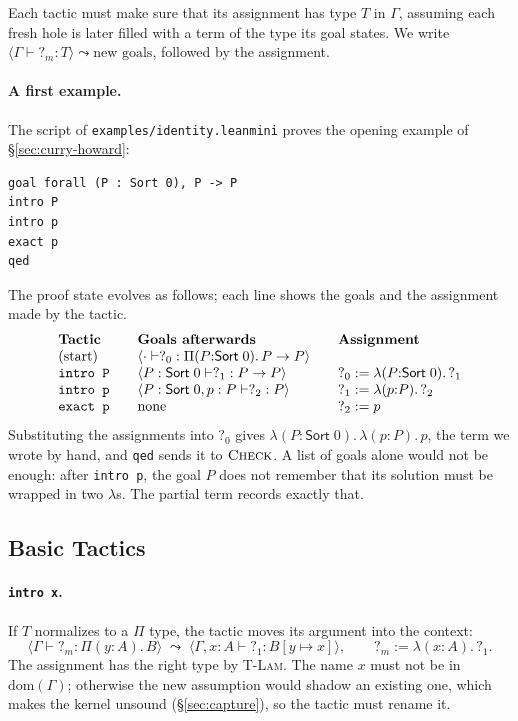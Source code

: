 \documentclass[acmsmall,screen,nonacm]{acmart}
\newcommand{\Sort}[1]{\mathsf{Sort}\;#1}
\newcommand{\tPi}[3]{\Pi(#1{:}#2).\,#3}
\newcommand{\tLam}[3]{\lambda(#1{:}#2).\,#3}
\newcommand{\subst}[3]{#1[#2 \mapsto #3]}
\newcommand{\dom}{\mathrm{dom}}
\newcommand{\hole}[1]{?_{#1}}
\begin{document}
Each tactic must make sure that its assignment has type $T$ in $\Gamma$, assuming each fresh hole is later filled with a term of the type its goal states.
We write $\langle \Gamma \vdash \hole{m} : T \rangle \leadsto \text{new goals}$, followed by the assignment.

\paragraph{A first example.}
The script of \texttt{examples/identity.leanmini} proves the opening example of \S\ref{sec:curry-howard}:
\begin{lstlisting}[numbers=none, columns=fullflexible, keepspaces=true]
goal forall (P : Sort 0), P -> P
intro P
intro p
exact p
qed
\end{lstlisting}
The proof state evolves as follows; each line shows the goals and the assignment made by the tactic.
\[
\begin{array}{l@{\qquad}l@{\qquad}l}
\textbf{Tactic} & \textbf{Goals afterwards} & \textbf{Assignment} \\
\text{(start)} & \langle \cdot \vdash \hole{0} : \tPi{P}{\Sort{0}}{P \to P} \rangle & \\
\texttt{intro P} & \langle P : \Sort{0} \vdash \hole{1} : P \to P \rangle & \hole{0} \mathrel{:=} \tLam{P}{\Sort{0}}{\hole{1}} \\
\texttt{intro p} & \langle P : \Sort{0}, p : P \vdash \hole{2} : P \rangle & \hole{1} \mathrel{:=} \tLam{p}{P}{\hole{2}} \\
\texttt{exact p} & \text{none} & \hole{2} \mathrel{:=} p
\end{array}
\]
Substituting the assignments into $\hole{0}$ gives $\tLam{P}{\Sort{0}}{\tLam{p}{P}{p}}$, the term we wrote by hand,
and \texttt{qed} sends it to $\textsc{Check}$.
A list of goals alone would not be enough: after \texttt{intro p}, the goal $P$ does not remember that its solution must be wrapped in two $\lambda$s.
The partial term records exactly that.

\subsection{Basic Tactics}

\paragraph{\texttt{intro x}.}
If $T$ normalizes to a $\Pi$ type, the tactic moves its argument into the context:
\[
\langle \Gamma \vdash \hole{m} : \tPi{y}{A}{B} \rangle \;\leadsto\; \langle \Gamma, x : A \vdash \hole{1} : \subst{B}{y}{x} \rangle,
\qquad
\hole{m} \mathrel{:=} \tLam{x}{A}{\hole{1}}.
\]
The assignment has the right type by \textsc{T-Lam}.
The name $x$ must not be in $\dom(\Gamma)$; otherwise the new assumption would shadow an existing one, which makes the kernel unsound (\S\ref{sec:capture}), so the tactic must rename it.
\end{document}
